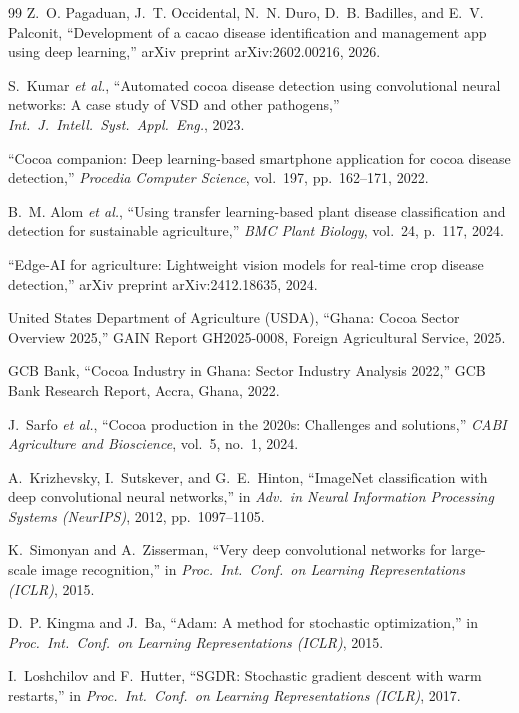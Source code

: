 \documentclass[conference,10pt]{IEEEtran}
\begin{document}
\begin{thebibliography}{99}
Z.~O. Pagaduan, J.~T. Occidental, N.~N. Duro, D.~B. Badilles, and E.~V. Palconit,
``Development of a cacao disease identification and management app using deep learning,''
arXiv preprint arXiv:2602.00216, 2026.

S.~Kumar \emph{et al.},
``Automated cocoa disease detection using convolutional neural networks: A case study of VSD and other pathogens,''
\emph{Int.\ J.\ Intell.\ Syst.\ Appl.\ Eng.}, 2023.

``Cocoa companion: Deep learning-based smartphone application for cocoa disease detection,''
\emph{Procedia Computer Science}, vol.~197, pp.~162--171, 2022.

B.~M. Alom \emph{et al.},
``Using transfer learning-based plant disease classification and detection for sustainable agriculture,''
\emph{BMC Plant Biology}, vol.~24, p.~117, 2024.

``Edge-AI for agriculture: Lightweight vision models for real-time crop disease detection,''
arXiv preprint arXiv:2412.18635, 2024.

United States Department of Agriculture (USDA),
``Ghana: Cocoa Sector Overview 2025,''
GAIN Report GH2025-0008, Foreign Agricultural Service, 2025.

GCB Bank,
``Cocoa Industry in Ghana: Sector Industry Analysis 2022,''
GCB Bank Research Report, Accra, Ghana, 2022.

J.~Sarfo \emph{et al.},
``Cocoa production in the 2020s: Challenges and solutions,''
\emph{CABI Agriculture and Bioscience}, vol.~5, no.~1, 2024.

A.~Krizhevsky, I.~Sutskever, and G.~E.~Hinton,
``ImageNet classification with deep convolutional neural networks,''
in \emph{Adv.\ in Neural Information Processing Systems (NeurIPS)}, 2012,
pp.~1097--1105.

K.~Simonyan and A.~Zisserman,
``Very deep convolutional networks for large-scale image recognition,''
in \emph{Proc.\ Int.\ Conf.\ on Learning Representations (ICLR)}, 2015.

D.~P. Kingma and J.~Ba,
``Adam: A method for stochastic optimization,''
in \emph{Proc.\ Int.\ Conf.\ on Learning Representations (ICLR)}, 2015.

I.~Loshchilov and F.~Hutter,
``SGDR: Stochastic gradient descent with warm restarts,''
in \emph{Proc.\ Int.\ Conf.\ on Learning Representations (ICLR)}, 2017.


\end{thebibliography}
\end{document}

